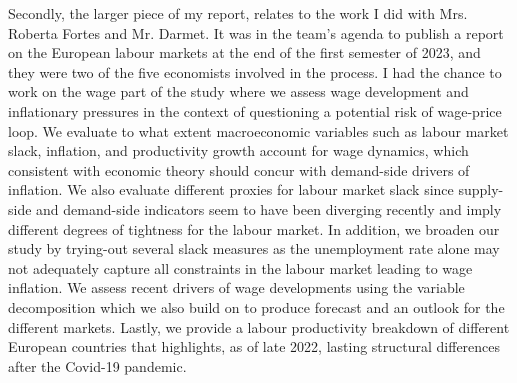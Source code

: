 Secondly, the larger piece of my report, relates to the work I did with Mrs. Roberta Fortes and Mr. Darmet. 
It was in the team's agenda to publish a report on the European labour markets\cite{az_labour} at the end of the first semester of 2023, and they were two of the five economists involved in the process. 
I had the chance to work on the wage part of the study where we assess wage development and inflationary pressures in the context of questioning a potential risk of wage-price loop. 
We evaluate to what extent macroeconomic variables such as labour market slack, inflation, and productivity growth account for wage dynamics, which consistent with economic theory should concur with demand-side drivers of inflation. 
We also evaluate different proxies for labour market slack since supply-side and demand-side indicators seem to have been diverging recently and imply different degrees of tightness for the labour market. 
In addition, we broaden our study by trying-out several slack measures as the unemployment rate alone may not adequately capture all constraints in the labour market leading to wage inflation. 
We assess recent drivers of wage developments using the variable decomposition which we also build on to produce forecast and an outlook for the different markets. 
Lastly, we provide a labour productivity breakdown of different European countries that highlights, as of late 2022, lasting structural differences after the Covid-19 pandemic.